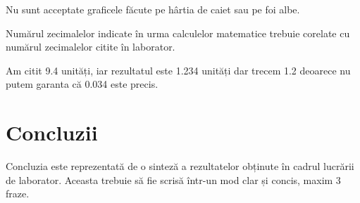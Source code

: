 \documentclass[12pt]{article}
\begin{document}
\begin{tcolorbox}[colback=yellow!10!white, colframe=black, title=Observație]
Nu sunt acceptate graficele făcute pe hârtia de caiet sau pe foi albe.
\end{tcolorbox}

Numărul zecimalelor indicate în urma calculelor matematice trebuie corelate cu numărul zecimalelor citite în laborator.

\begin{tcolorbox}[colback=yellow!10!white, colframe=black, title=Exemplu]
Am citit 9.4 unități, iar rezultatul este 1.234 unități dar trecem 1.2 deoarece nu putem garanta că 0.034 este precis.
\end{tcolorbox}

\section{Concluzii}
Concluzia este reprezentată de o sinteză a rezultatelor obținute în cadrul lucrării de laborator.
Aceasta trebuie să fie scrisă într-un mod clar și concis, maxim 3 fraze.
\end{document}

